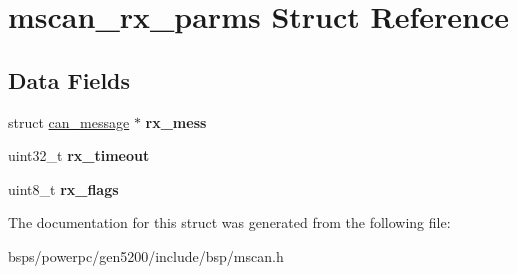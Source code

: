 \hypertarget{structmscan__rx__parms}{}\section{mscan\+\_\+rx\+\_\+parms Struct Reference}
\label{structmscan__rx__parms}
\subsection*{Data Fields}
\begin{DoxyCompactItemize}
\item 
\mbox{\label{structmscan__rx__parms_ae1b6b629170c5d8ebe61ada0a9d3b53f}} 
struct \mbox{\hyperlink{unioncan__message}{can\+\_\+message}} $\ast$ {\bfseries rx\+\_\+mess}
\item 
\mbox{\label{structmscan__rx__parms_a65fce7fc02c08d7a517b5b4a5dcf349a}} 
uint32\+\_\+t {\bfseries rx\+\_\+timeout}
\item 
\mbox{\label{structmscan__rx__parms_a661b5ccfde628c979f30d30e28871d6e}} 
uint8\+\_\+t {\bfseries rx\+\_\+flags}
\end{DoxyCompactItemize}


The documentation for this struct was generated from the following file\+:\begin{DoxyCompactItemize}
\item 
bsps/powerpc/gen5200/include/bsp/mscan.\+h\end{DoxyCompactItemize}
